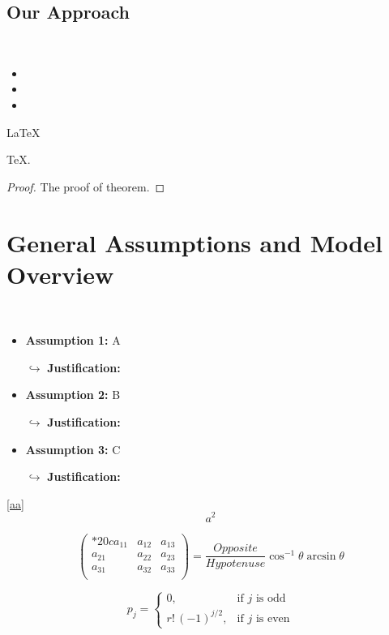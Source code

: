 \documentclass{mcmthesis}
\begin{document}
\subsection{Our Approach}
\ 
\indent \lipsum[3]

\begin{itemize}
	\item
	\item
	\item
\end{itemize}

\begin{Theorem} \label{thm:latex}
\LaTeX
\end{Theorem}
\begin{Lemma} \label{thm:tex}
\TeX .
\end{Lemma}
\begin{proof}
The proof of theorem.
\end{proof}

\section{General Assumptions and Model Overview}
\ 
\indent \lipsum[4]
\begin{itemize}
	\item \textbf{Assumption 1:} A
	
	$\hookrightarrow$ \textbf{Justification:} \lipsum[5]
	\item \textbf{Assumption 2:} B
	
	$\hookrightarrow$ \textbf{Justification:} \lipsum[6] \cite{1}
	\item \textbf{Assumption 3:} C
	
	$\hookrightarrow$ \textbf{Justification:} \lipsum[7]
\end{itemize}


\lipsum[8] \eqref{aa}
\begin{equation}
a^2 \label{aa}
\end{equation}

\[
  \begin{pmatrix}{*{20}c}
  {a_{11} } & {a_{12} } & {a_{13} }  \\
  {a_{21} } & {a_{22} } & {a_{23} }  \\
  {a_{31} } & {a_{32} } & {a_{33} }  \\
  \end{pmatrix}
  = \frac{{Opposite}}{{Hypotenuse}}\cos ^{ - 1} \theta \arcsin \theta
\]
\lipsum[9]

\[
  p_{j}=\begin{cases} 0,&\text{if $j$ is odd}\\
  r!\,(-1)^{j/2},&\text{if $j$ is even}
  \end{cases}
\]
\end{document}
